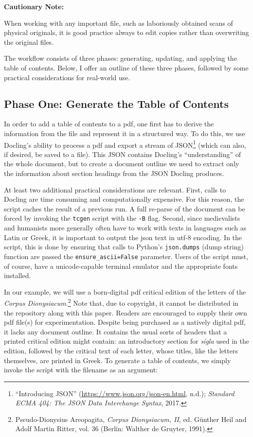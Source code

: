 \documentclass[
  letterpaper,
]{tufte-handout}
\begin{document}
\textbf{Cautionary Note:}

When working with any important file, such as laboriously obtained scans
of physical originals, it is good practice always to edit copies rather
than overwriting the original files.

The workflow consists of three phases: generating, updating, and
applying the table of contents. Below, I offer an outline of these three
phases, followed by some practical considerations for real-world use.

\subsection{Phase One: Generate the Table of
Contents}\label{phase-one-generate-the-table-of-contents}

In order to add a table of contents to a pdf, one first has to derive
the information from the file and represent it in a structured way. To
do this, we use Docling's ability to process a pdf and export a stream
of JSON\footnote{{``Introducing JSON''}
  (\url{https://www.json.org/json-en.html}, n.d.); \emph{Standard ECMA
  404: The JSON Data Interchange Syntax}, 2017.} (which can also, if
desired, be saved to a file). This JSON contains Docling's
``understanding'' of the whole document, but to create a document
outline we need to extract only the information about section headings
from the JSON Docling produces.

At least two additional practical considerations are relevant. First,
calls to Docling are time consuming and computationally expensive. For
this reason, the script caches the result of a previous run. A full
re-parse of the document can be forced by invoking the \texttt{tcgen}
script with the \texttt{-B} flag. Second, since medievalists and
humanists more generally often have to work with texts in languages such
as Latin or Greek, it is important to output the json text in utf-8
encoding. In the script, this is done by ensuring that calls to Python's
\texttt{json.dumps} (dump string) function are passed the
\texttt{ensure\_ascii=False} parameter. Users of the script must, of
course, have a unicode-capable terminal emulator and the appropriate
fonts installed.

In our example, we will use a born-digital pdf critical edition of the
letters of the \emph{Corpus Dionysiacum}.\footnote{Pseudo-Dionysius
  Areopagita, \emph{Corpus Dionysiacum, II}, ed. Günther Heil and Adolf
  Martin Ritter, vol. 36 (Berlin: Walther de Gruyter, 1991).} Note that,
due to copyright, it cannot be distributed in the repository along with
this paper. Readers are encouraged to supply their own pdf file(s) for
experimentation. Despite being purchased as a natively digital pdf, it
lacks any document outline. It contains the usual sorts of headers that
a printed critical edition might contain: an introductory section for
\emph{sigla} used in the edition, followed by the critical text of each
letter, whose titles, like the letters themselves, are printed in Greek.
To generate a table of contents, we simply invoke the script with the
filename as an argument:
\end{document}
